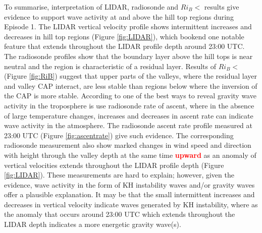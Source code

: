 \documentclass[times]{qjrms4}
\begin{document}
To summarise, interpretation of LIDAR, radiosonde and $Ri_B <$ results give evidence to support wave activity at and above the hill top regions during Episode 1. The LIDAR vertical velocity profile shows intermittent increases and decreases in hill top regions (Figure \ref{fig:LIDAR}), which bookend one notable feature that extends throughout the LIDAR profile depth around 23:00 UTC. The radiosonde profiles show that the boundary layer above the hill tops is near neutral and the region is characteristic of a residual layer. Results of $Ri_B <$ (Figure \ref{fig:RiB}) suggest that upper parts of the valleys, where the residual layer and valley CAP interact, are less stable than regions below where the inversion of the CAP is more stable. According to \citet{lalas1980tropospheric} one of the best ways to reveal gravity wave activity in the troposphere is use radiosonde rate of ascent, where in the absence of large temperature changes, increases and decreases in ascent rate can indicate wave activity in the atmosphere. The radiosonde ascent rate profile measured at 23:00 UTC (Figure \ref{fig:ascentrate}) give such evidence. The corresponding radiosonde measurement also show marked changes in wind speed and direction with height through the valley depth at the same time \textcolor{red}{\bf upward} as an anomaly of vertical velocities extends throughout the LIDAR profile depth (Figure \ref{fig:LIDAR}). These measurements are hard to explain; however, given the evidence, wave activity in the form of KH instability waves and/or gravity waves offer a plausible explanation. It may be that the small intermittent increases and decreases in vertical velocity indicate waves generated by KH instability, where as the anomaly that occurs around 23:00 UTC which extends throughout the LIDAR depth indicates a more energetic gravity wave(s).
%
%
\end{document}
